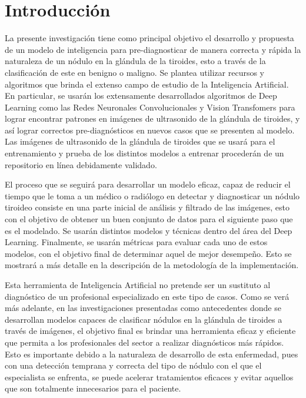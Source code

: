 
\chapter*{Introducción}
La presente investigación tiene como principal objetivo el desarrollo y propuesta de un modelo de inteligencia para pre-diagnosticar de manera correcta y rápida la naturaleza de un nódulo en la glándula de la tiroides, esto a través de la clasificación de este en benigno o maligno. Se plantea utilizar recursos y algoritmos que brinda el extenso campo de estudio de la Inteligencia Artificial. En particular, se usarán los extensamente desarrollados algoritmos de Deep Learning como las Redes Neuronales Convolucionales y Vision Transfomers para lograr encontrar patrones en imágenes de ultrasonido de la glándula de tiroides, y así lograr correctos pre-diagnósticos en nuevos casos que se presenten al modelo. Las imágenes de ultrasonido de la glándula de tiroides que se usará para el entrenamiento y prueba de los distintos modelos a entrenar procederán de un repositorio en línea debidamente validado.	

El proceso que se seguirá para desarrollar un modelo eficaz, capaz de reducir el tiempo que le toma a un médico o radiólogo en detectar y diagnosticar un nódulo tiroideo consiste en una parte inicial de análisis y filtrado de las imágenes, esto con el objetivo de obtener un buen conjunto de datos para el siguiente paso que es el modelado. Se usarán distintos modelos y técnicas dentro del área del Deep Learning. Finalmente, se usarán métricas para evaluar cada uno de estos modelos, con el objetivo final de determinar aquel de mejor desempeño. Esto se mostrará a más detalle en la descripción de la metodología de la implementación.

Esta herramienta de Inteligencia Artificial no pretende ser un sustituto al diagnóstico de un profesional especializado en este tipo de casos. Como se verá más adelante, en las investigaciones presentadas como antecedentes donde se desarrollan modelos capaces de clasificar nódulos en la glándula de tiroides a través de imágenes, el objetivo final es brindar una herramienta eficaz y eficiente que permita a los profesionales del sector a realizar diagnósticos más rápidos. Esto es importante debido a la naturaleza de desarrollo de esta enfermedad, pues con una detección temprana y correcta del tipo de nódulo con el que el especialista se enfrenta, se puede acelerar tratamientos eficaces y evitar aquellos que son totalmente innecesarios para el paciente.

